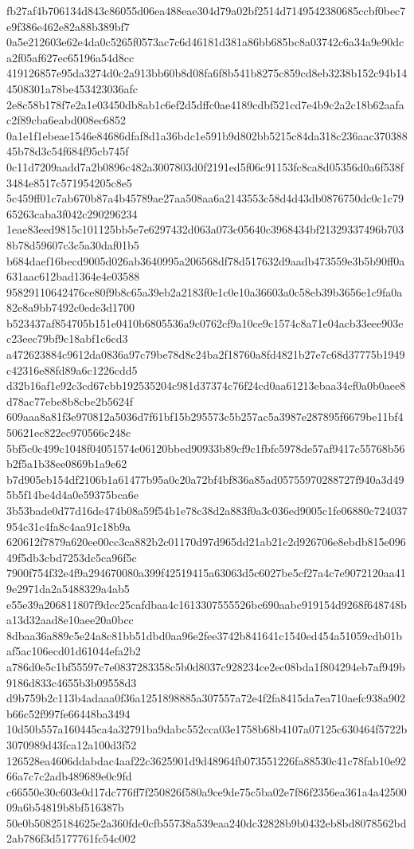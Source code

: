 {fb27af4b706134d843c86055d06ea488eae304d79a02bf2514d7149542380685ccbf0bec7e9f386e462e82a88b389bf7
0a5e212603e62e4da0c5265f0573ac7c6d46181d381a86bb685bc8a03742c6a34a9e90dca2f05af627ec65196a54d8cc
419126857e95da3274d0c2a913bb60b8d08fa6f8b541b8275c859cd8eb3238b152c94b144508301a78be453423036afc
2e8c58b178f7e2a1e03450db8ab1c6ef2d5dffc0ae4189cdbf521cd7e4b9c2a2c18b62aafac2f89cba6eabd008ec6852
0a1e1f1ebeae1546e84686dfaf8d1a36bdc1e591b9d802bb5215c84da318c236aac37038845b78d3c54f684f95cb745f
0c11d7209aadd7a2b0896c482a3007803d0f2191ed5f06c91153fc8ca8d05356d0a6f538f3484e8517c571954205c8e5
5c459ff01c7ab670b87a4b45789ae27aa508aa6a2143553c58d4d43db0876750dc0c1c7965263caba3f042c290296234
1eae83eed9815c101125bb5e7e6297432d063a073c05640c3968434bf21329337496b7038b78d59607c3c5a30daf01b5
b684daef16becd9005d026ab3640995a206568df78d517632d9aadb473559e3b5b90ff0a631aac612bad1364e4e03588
95829110642476ce80f9b8c65a39eb2a2183f0e1c0e10a36603a0c58eb39b3656e1c9fa0a82e8a9bb7492c0ede3d1700
b523437af854705b151e0410b6805536a9c0762cf9a10ce9c1574c8a71e04acb33eee903ec23eec79bf9c18abf1c6cd3
a472623884c9612da0836a97c79be78d8c24ba2f18760a8fd4821b27e7c68d37775b1949c42316e88fd89a6c1226cdd5
d32b16af1e92c3cd67cbb192535204c981d37374c76f24cd0aa61213ebaa34cf0a0b0aee8d78ac77ebe8b8cbe2b5624f
609aaa8a81f3e970812a5036d7f61bf15b295573c5b257ac5a3987e287895f6679be11bf450621ec822ec970566c248c
5bf5c0c499c1048f04051574e06120bbed90933b89cf9c1fbfc5978de57af9417c55768b56b2f5a1b38ee0869b1a9e62
b7d905eb154df2106b1a61477b95a0c20a72bf4bf836a85ad05755970288727f940a3d495b5f14be4d4a0e59375bca6e
3b53bade0d77d16de474b08a59f54b1e78c38d2a883f0a3c036ed9005c1fe06880c724037954c31c4fa8c4aa91c18b9a
620612f7879a620ee00cc3ca882b2c01170d97d965dd21ab21c2d926706e8ebdb815e09649f5db3cbd7253dc5ca96f5c
7900f754f32e4f9a294670080a399f42519415a63063d5c6027be5cf27a4c7e9072120aa419e2971da2a5488329a4ab5
e55e39a206811807f9dcc25cafdbaa4c1613307555526bc690aabc919154d9268f648748ba13d32aad8e10aee20a0bcc
8dbaa36a889c5e24a8c81bb51dbd0aa96e2fee3742b841641c1540ed454a51059cdb01baf5ac106ecd01d61044efa2b2
a786d0e5c1bf55597c7e0837283358c5b0d8037c928234ce2ec08bda1f804294eb7af949b9186d833c4655b3b09558d3
d9b759b2c113b4adaaa0f36a1251898885a307557a72e4f2fa8415da7ea710aefc938a902b66c52f997fe66448ba3494
10d50b557a160445ca4a32791ba9dabc552cca03e1758b68b4107a07125c630464f5722b3070989d43fca12a100d3f52
126528ea4606ddabdac4aaf22c3625901d9d48964fb073551226fa88530c41c78fab10e9266a7c7c2adb489689e0c9fd
c66550e30c603e0d17dc776ff7f250826f580a9ce9de75c5ba02e7f86f2356ea361a4a4250009a6b54819b8bf516387b
50e0b50825184625e2a360fde0cfb55738a539eaa240dc32828b9b0432eb8bd8078562bd2ab786f3d5177761fc54c002
}
